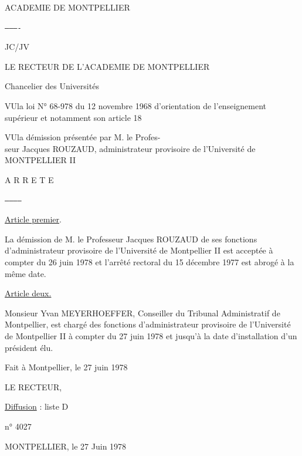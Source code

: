 ACADEMIE DE MONTPELLIER

\texttt{----------}

JC/JV

LE RECTEUR DE L'ACADEMIE DE MONTPELLIER

Chancelier des Universités

VU\qquad la loi N° 68-978 du 12 novembre 1968
d'orientation de l'enseignement supérieur
et notamment son article 18

VU\qquad la démission présentée par M. le Profes-\\
seur Jacques ROUZAUD, administrateur
provisoire de l'Université de
MONTPELLIER II

A R R E T E

\texttt{-----------}

\uline{Article premier}.

La démission de M. le Professeur Jacques ROUZAUD
de ses fonctions d'administrateur provisoire de
l'Université de Montpellier II est acceptée à compter
du 26 juin 1978 et l'arrêté rectoral du 15 décembre
1977 est abrogé à la même date.

\uline{Article deux.}

Monsieur Yvan MEYERHOEFFER, Conseiller du Tribunal
Administratif de Montpellier, est chargé des fonctions
d'administrateur provisoire de l'Université de
Montpellier II à compter du 27 juin 1978 et jusqu'à
la date d'installation d'un président élu.

Fait à Montpellier, le 27 juin 1978

LE RECTEUR,


\uline{Diffusion} : liste D

n° 4027

MONTPELLIER, le 27 Juin 1978

